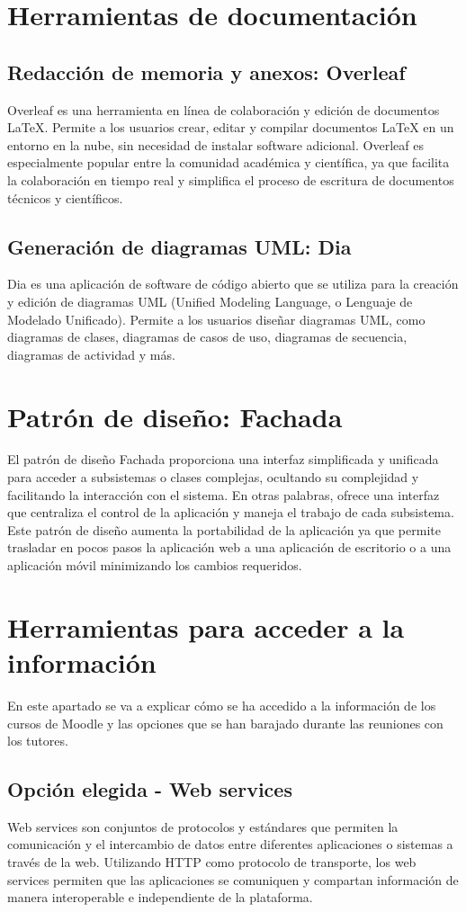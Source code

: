 \section{Herramientas de documentación}
\subsection{Redacción de memoria y anexos: Overleaf}
Overleaf es una herramienta en línea de colaboración y edición de documentos LaTeX. Permite a los usuarios crear, editar y compilar documentos LaTeX en un entorno en la nube, sin necesidad de instalar software adicional. Overleaf es especialmente popular entre la comunidad académica y científica, ya que facilita la colaboración en tiempo real y simplifica el proceso de escritura de documentos técnicos y científicos.
\subsection{Generación de diagramas UML: Dia}
Dia es una aplicación de software de código abierto que se utiliza para la creación y edición de diagramas UML (Unified Modeling Language, o Lenguaje de Modelado Unificado). Permite a los usuarios diseñar diagramas UML, como diagramas de clases, diagramas de casos de uso, diagramas de secuencia, diagramas de actividad y más.

\section{Patrón de diseño: Fachada}
El patrón de diseño Fachada proporciona una interfaz simplificada y unificada para acceder a subsistemas o clases complejas, ocultando su complejidad y facilitando la interacción con el sistema. En otras palabras, ofrece una interfaz que centraliza el control de la aplicación y maneja el trabajo de cada subsistema.
Este patrón de diseño aumenta la portabilidad de la aplicación ya que permite trasladar en pocos pasos la aplicación web a una aplicación de escritorio o a una aplicación móvil minimizando los cambios requeridos.

 \section{Herramientas para acceder a la información}
En este apartado se va a explicar cómo se ha accedido a la información de los cursos de Moodle y las opciones que se han barajado durante las reuniones con los tutores.
\subsection{Opción elegida - Web services}
Web services son conjuntos de protocolos y estándares que permiten la comunicación y el intercambio de datos entre diferentes aplicaciones o sistemas a través de la web. Utilizando HTTP como protocolo de transporte, los web services permiten que las aplicaciones se comuniquen y compartan información de manera interoperable e independiente de la plataforma.

